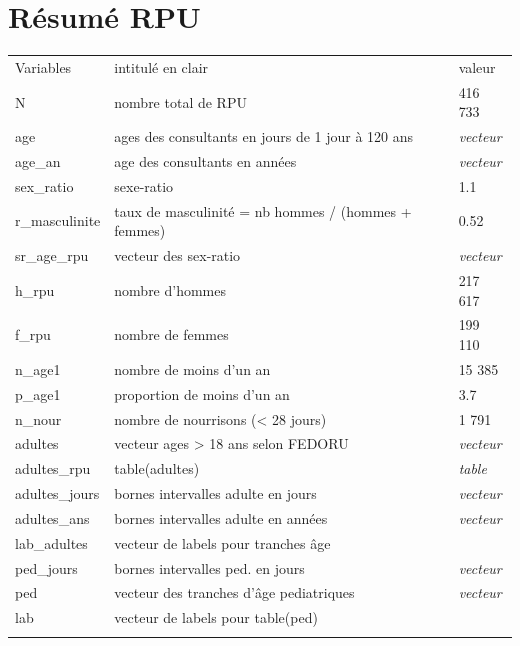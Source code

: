 \documentclass[]{article}
\begin{document}
\section{Résumé RPU}\label{resume-rpu}

\begin{longtable}[c]{@{}lll@{}}
\toprule\addlinespace
Variables & intitulé en clair & valeur
\\\addlinespace
\midrule\endhead
N & nombre total de RPU & 416 733
\\\addlinespace
age & ages des consultants en jours de 1 jour à 120 ans & \emph{vecteur}
\\\addlinespace
age\_an & age des consultants en années & \emph{vecteur}
\\\addlinespace
sex\_ratio & sexe-ratio & 1.1
\\\addlinespace
r\_masculinite & taux de masculinité = nb hommes / (hommes + femmes) &
0.52
\\\addlinespace
sr\_age\_rpu & vecteur des sex-ratio & \emph{vecteur}
\\\addlinespace
h\_rpu & nombre d'hommes & 217 617
\\\addlinespace
f\_rpu & nombre de femmes & 199 110
\\\addlinespace
n\_age1 & nombre de moins d'un an & 15 385
\\\addlinespace
p\_age1 & proportion de moins d'un an & 3.7
\\\addlinespace
n\_nour & nombre de nourrisons (\textless{} 28 jours) & 1 791
\\\addlinespace
adultes & vecteur ages \textgreater{} 18 ans selon FEDORU &
\emph{vecteur}
\\\addlinespace
adultes\_rpu & table(adultes) & \emph{table}
\\\addlinespace
adultes\_jours & bornes intervalles adulte en jours & \emph{vecteur}
\\\addlinespace
adultes\_ans & bornes intervalles adulte en années & \emph{vecteur}
\\\addlinespace
lab\_adultes & vecteur de labels pour tranches âge &
\\\addlinespace
ped\_jours & bornes intervalles ped. en jours & \emph{vecteur}
\\\addlinespace
ped & vecteur des tranches d'âge pediatriques & \emph{vecteur}
\\\addlinespace
lab & vecteur de labels pour table(ped) &
\\\addlinespace
\bottomrule
\end{longtable}
\end{document}
